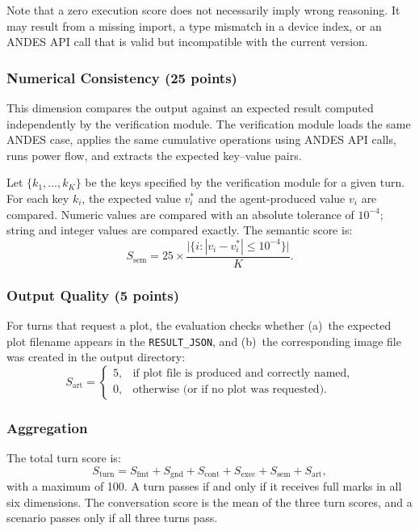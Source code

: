 \documentclass[journal]{IEEEtran}
\begin{document}
Note that a zero execution score does not necessarily imply wrong reasoning.
It may result from a missing import, a type mismatch in a device index, or an ANDES API call that is valid but incompatible with the current version.


\subsubsection{Numerical Consistency (25 points)}

This dimension compares the output against an expected result computed independently by the verification module.
The verification module loads the same ANDES case, applies the same cumulative operations using ANDES API calls, runs power flow, and extracts the expected key--value pairs.

Let $\{k_1, \ldots, k_K\}$ be the keys specified by the verification module for a
given turn. For each key $k_i$, the expected value $v_i^{*}$ and the agent-produced value $v_i$ are compared.
Numeric values are compared with an absolute tolerance of $10^{-4}$; string and integer values are compared exactly. The semantic score is:
\begin{equation}
S_{\mathrm{sem}} = 25 \times
  \frac{\bigl|\{i : |v_i - v_i^{*}| \le 10^{-4}\}\bigr|}{K}.
\label{eq:semantic}
\end{equation}

\subsubsection{Output Quality (5 points)}

For turns that request a plot, the evaluation checks whether (a)~the expected plot filename appears in the \texttt{RESULT\_JSON}, and (b)~the corresponding image file was
created in the output directory:
\begin{equation}
S_{\mathrm{art}} =
  \begin{cases}
    5, & \text{if plot file is produced and correctly named},\\
    0, & \text{otherwise (or if no plot was requested)}.
  \end{cases}
\label{eq:artifact}
\end{equation}

\subsubsection{Aggregation}

The total turn score is:
\begin{equation}
S_{\mathrm{turn}} = S_{\mathrm{fmt}} + S_{\mathrm{gnd}}
  + S_{\mathrm{cont}} + S_{\mathrm{exec}} + S_{\mathrm{sem}}
  + S_{\mathrm{art}},
\label{eq:total}
\end{equation}
with a maximum of 100. A turn passes if and only if it receives full marks in all six dimensions.
The conversation score is the mean of the three turn scores, and a scenario passes only if all three turns pass.
\end{document}
